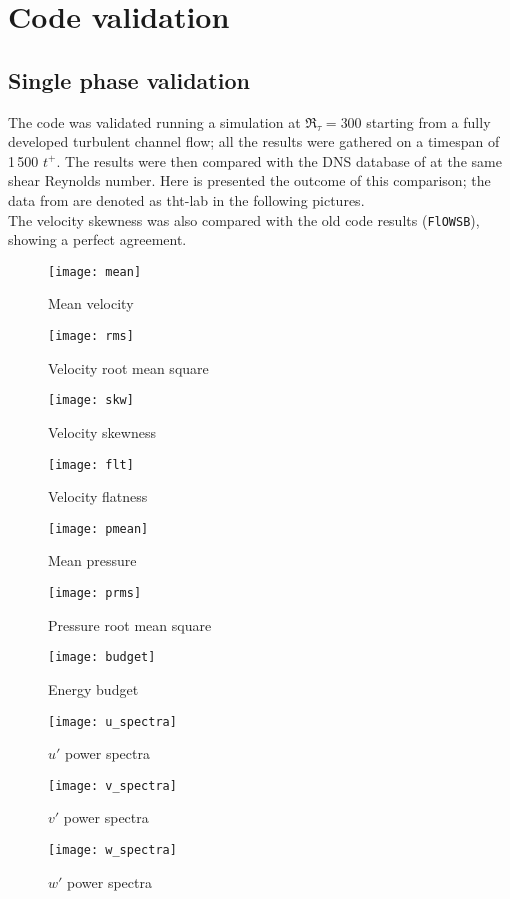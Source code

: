 \chapter{Code validation}
\section{Single phase validation}
The code was validated running a simulation at $\Re_\tau=300$ starting from a fully developed turbulent channel flow; all the results were gathered on a timespan of 1\,500 $t^+$. The results were then compared with the DNS database of \cite{thtlab} at the same shear Reynolds number. Here is presented the outcome of this comparison; the data from \cite{thtlab} are denoted as tht-lab in the following pictures.\\
The velocity skewness was also compared with the old code results (\texttt{FlOWSB}), showing a perfect agreement.
\begin{figure}[H]
\centering
\texttt{[image: mean]}
\caption{Mean velocity}
\end{figure}
\begin{figure}[H]
\centering
\texttt{[image: rms]}
\caption{Velocity root mean square}
\end{figure}
\begin{figure}[H]
\centering
\texttt{[image: skw]}
\caption{Velocity skewness}
\end{figure}
\begin{figure}[H]
\centering
\texttt{[image: flt]}
\caption{Velocity flatness}
\end{figure}
\begin{figure}[H]
\centering
\texttt{[image: pmean]}
\caption{Mean pressure}
\end{figure}
\begin{figure}[H]
\centering
\texttt{[image: prms]}
\caption{Pressure root mean square}
\end{figure}
\begin{sidewaysfigure}
\centering
\texttt{[image: budget]}
\caption{Energy budget}
\end{sidewaysfigure}
\begin{sidewaysfigure}
\centering
\texttt{[image: u\_spectra]}
\caption{$u'$ power spectra}
\end{sidewaysfigure}
\begin{sidewaysfigure}
\centering
\texttt{[image: v\_spectra]}
\caption{$v'$ power spectra}
\end{sidewaysfigure}
\begin{sidewaysfigure}
\centering
\texttt{[image: w\_spectra]}
\caption{$w'$ power spectra}
\end{sidewaysfigure}


